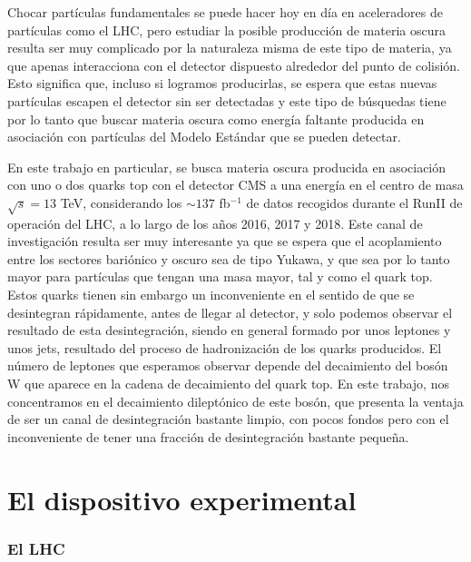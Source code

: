 \documentclass[a4paper, 10pt, openright]{report}
\begin{document}
\begin{appendices}
Chocar part\'{i}culas fundamentales se puede hacer hoy en d\'{i}a en aceleradores de part\'{i}culas como el \ac{LHC}, pero estudiar la posible producci\'{o}n de materia oscura resulta ser muy complicado por la naturaleza misma de este tipo de materia, ya que apenas interacciona con el detector dispuesto alrededor del punto de colisi\'{o}n. Esto significa que, incluso si logramos producirlas, se espera que estas nuevas part\'{i}culas escapen el detector sin ser detectadas y este tipo de b\'{u}squedas tiene por lo tanto que buscar materia oscura como energ\'{i}a faltante producida en asociaci\'{o}n con part\'{i}culas del Modelo Est\'{a}ndar que se pueden detectar. 

En este trabajo en particular, se busca materia oscura producida en asociaci\'{o}n con uno o dos quarks top con el detector \ac{CMS} a una energ\'{i}a en el centro de masa $\sqrt{s} = 13$ TeV, considerando los $\sim 137$ fb$^{-1}$ de datos recogidos durante el RunII de operaci\'{o}n del \ac{LHC}, a lo largo de los a\~{n}os 2016, 2017 y 2018. Este canal de investigaci\'{o}n resulta ser muy interesante ya que se espera que el acoplamiento entre los sectores bari\'{o}nico y oscuro sea de tipo Yukawa, y que sea por lo tanto mayor para part\'{i}culas que tengan una masa mayor, tal y como el quark top. Estos quarks tienen sin embargo un inconveniente en el sentido de que se desintegran r\'{a}pidamente, antes de llegar al detector, y solo podemos observar el resultado de esta desintegraci\'{o}n, siendo en general formado por unos leptones y unos jets, resultado del proceso de hadronizaci\'{o}n de los quarks producidos. El n\'{u}mero de leptones que esperamos observar depende del decaimiento del bos\'{o}n W que aparece en la cadena de decaimiento del quark top. En este trabajo, nos concentramos en el decaimiento dilept\'{o}nico de este bos\'{o}n, que presenta la ventaja de ser un canal de desintegraci\'{o}n bastante limpio, con pocos fondos pero con el inconveniente de tener una fracci\'{o}n de desintegraci\'{o}n bastante peque\~{n}a.

\section{El dispositivo experimental}

\subsubsection{El LHC}


\end{appendices}
\end{document}
